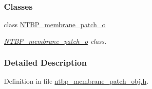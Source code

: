 \subsubsection*{Classes}
\begin{DoxyCompactItemize}
\item 
class \hyperlink{class_n_t_b_p__membrane__patch__o}{NTBP\_\-membrane\_\-patch\_\-o}
\begin{DoxyCompactList}\small\item\em \hyperlink{class_n_t_b_p__membrane__patch__o}{NTBP\_\-membrane\_\-patch\_\-o} class. \item\end{DoxyCompactList}\end{DoxyCompactItemize}


\subsubsection{Detailed Description}


Definition in file \hyperlink{ntbp__membrane__patch__obj_8h_source}{ntbp\_\-membrane\_\-patch\_\-obj.h}.

